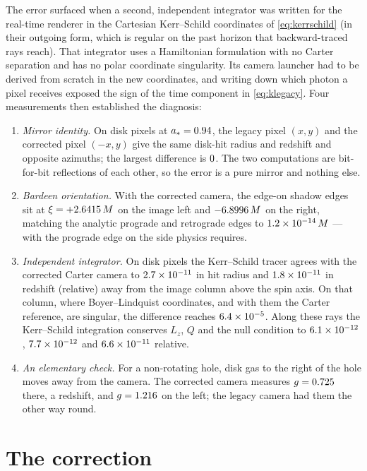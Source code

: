 The error surfaced when a second, independent integrator was written
for the real-time renderer in the Cartesian Kerr--Schild coordinates of
\eqref{eq:kerrschild} (in their outgoing form, which is regular on the
past horizon that backward-traced rays reach). That integrator uses a
Hamiltonian formulation with no Carter separation and has no polar
coordinate singularity. Its camera launcher had to be derived from
scratch in the new coordinates, and writing down which photon a pixel
receives exposed the sign of the time component in \eqref{eq:klegacy}.
Four measurements then established the diagnosis:
\begin{enumerate}
\item \emph{Mirror identity.} On \HandMirrorPixels{} disk pixels at
$a_* = 0.94$, the legacy pixel $(x, y)$ and the corrected pixel
$(-x, y)$ give the same disk-hit radius and redshift and opposite
azimuths; the largest difference is $0$. The two
computations are bit-for-bit reflections of each other, so the error is
a pure mirror and nothing else.
\item \emph{Bardeen orientation.} With the corrected camera, the
edge-on shadow edges sit at $\xi = +2.6415\,M$ on the image left and
$-6.8996\,M$ on the right, matching the analytic prograde and
retrograde edges to $1.2\times10^{-14}\,M$ — with the prograde edge on the
side physics requires.
\item \emph{Independent integrator.} On \HandKSPixels{} disk pixels the
Kerr--Schild tracer agrees with the corrected Carter camera to
$2.7\times10^{-11}$ in hit radius and $1.8\times10^{-11}$ in redshift
(relative) away from the image column above the spin axis. On that
column, where Boyer--Lindquist coordinates, and with them the Carter
reference, are singular, the difference reaches $6.4\times10^{-5}$. Along
these rays the Kerr--Schild integration conserves $L_z$, $Q$ and the
null condition to $6.1\times10^{-12}$, $7.7\times10^{-12}$ and $6.6\times10^{-11}$
relative.
\item \emph{An elementary check.} For a non-rotating hole, disk gas to
the right of the hole moves away from the camera. The corrected camera
measures $g = 0.725$ there, a redshift, and
$g = 1.216$ on the left; the legacy camera had them the other
way round.
\end{enumerate}

\section{The correction}
\label{sec:hand-fix}

